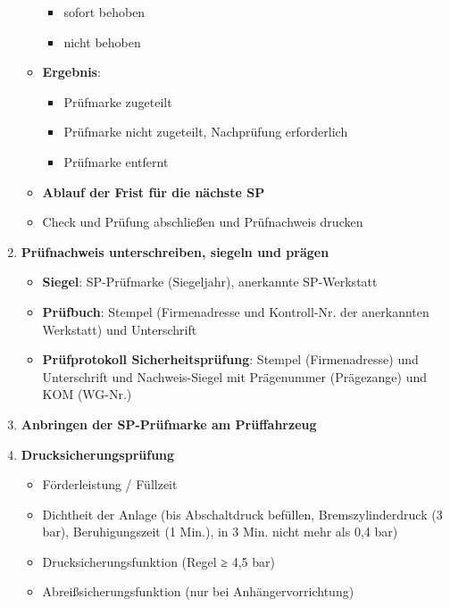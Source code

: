 \documentclass{vorlage-design-main}
\begin{document}
\begin{enumerate}
\begin{itemize}
    \begin{itemize}

    \item
      sofort behoben
    \item
      nicht behoben
    \end{itemize}
  \item
    \textbf{Ergebnis}:

    \begin{itemize}

    \item
      Prüfmarke zugeteilt
    \item
      Prüfmarke nicht zugeteilt, Nachprüfung erforderlich
    \item
      Prüfmarke entfernt
    \end{itemize}
  \item
    \textbf{Ablauf der Frist für die nächste SP}
  \item
    Check und Prüfung abschließen und Prüfnachweis drucken
  \end{itemize}
\item
  \textbf{Prüfnachweis unterschreiben, siegeln und prägen}

  \begin{itemize}

  \item
    \textbf{Siegel}: SP-Prüfmarke (Siegeljahr), anerkannte SP-Werkstatt
  \item
    \textbf{Prüfbuch}: Stempel (Firmenadresse und Kontroll-Nr. der
    anerkannten Werkstatt) und Unterschrift
  \item
    \textbf{Prüfprotokoll Sicherheitsprüfung}: Stempel (Firmenadresse)
    und Unterschrift und Nachweis-Siegel mit Prägenummer (Prägezange)
    und KOM (WG-Nr.)
  \end{itemize}
\item
  \textbf{Anbringen der SP-Prüfmarke am Prüffahrzeug}
\item
  \textbf{Drucksicherungsprüfung}

  \begin{itemize}

  \item
    Förderleistung / Füllzeit
  \item
    Dichtheit der Anlage (bis Abschaltdruck befüllen, Bremszylinderdruck
    (3 bar), Beruhigungszeit (1 Min.), in 3 Min. nicht mehr als 0,4 bar)
  \item
    Drucksicherungsfunktion (Regel ≥ 4,5 bar)
  \item
    Abreißsicherungsfunktion (nur bei Anhängervorrichtung)


\end{itemize}
\end{enumerate}
\end{document}
